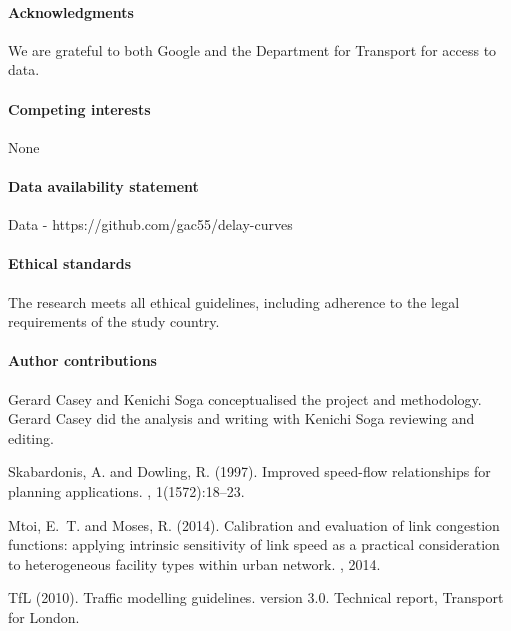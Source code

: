 \documentclass{CUP-JNL-DCE}
\begin{document}
\begin{Backmatter}

\paragraph{Acknowledgments}
We are grateful to both Google and the Department for Transport for access to data. 

\paragraph{Competing interests}
None

\paragraph{Data availability statement}
Data - https://github.com/gac55/delay-curves

\paragraph{Ethical standards}
The research meets all ethical guidelines, including adherence to the legal requirements of the study country.

\paragraph{Author contributions}
Gerard Casey and Kenichi Soga conceptualised the project and methodology. Gerard Casey did the analysis and writing with Kenichi Soga reviewing and editing. 


%

\begin{thebibliography}{}

Skabardonis, A. and Dowling, R. (1997).
\newblock Improved speed-flow relationships for planning applications.
, 1(1572):18--23.

Mtoi, E.~T. and Moses, R. (2014).
\newblock Calibration and evaluation of link congestion functions: applying
intrinsic sensitivity of link speed as a practical consideration to
heterogeneous facility types within urban network.
, 2014.

TfL (2010).
\newblock Traffic modelling guidelines. version 3.0.
\newblock Technical report, Transport for London.


\end{thebibliography}
\end{Backmatter}
\end{document}
